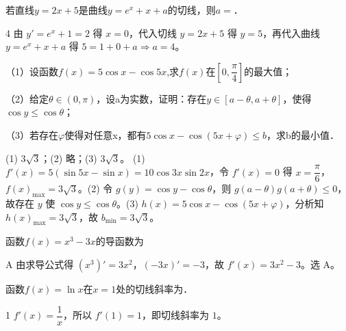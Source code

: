


\begin{question}
若直线$y=2x+5$是曲线$y=e^x+x+a$的切线，则$a=$\blank{3cm}．
\end{question}
\begin{answer}{4}
由 $y'=e^x+1=2$ 得 $x=0$，代入切线 $y=2x+5$ 得 $y=5$，再代入曲线 $y=e^x+x+a$ 得 $5=1+0+a\Rightarrow a=4$。
\end{answer}

\begin{question}
（1）设函数$f(x)=5\cos x-\cos 5x$,求$f(x)$在$\left[ 0,\dfrac{\pi}{4} \right]$的最大值；

（2）给定$\theta \in (0,\pi)$，设a为实数，证明：存在$y\in [a-\theta ,a+\theta ]$，使得$\cos y\le \cos \theta $；

（3）若存在$\varphi $使得对任意x，都有$5\cos x-\cos (5x+\varphi )\le b$，求b的最小值．
\end{question}
\begin{answer}{(1) $3\sqrt3$；(2) 略；(3) $3\sqrt3$。}
(1) $f'(x)=5(\sin5x-\sin x)=10\cos3x\sin2x$，令 $f'(x)=0$ 得 $x=\dfrac{\pi}{6}$，$f(x)_{\max}=3\sqrt3$。(2) 令 $g(y)=\cos y-\cos\theta$，则 $g(a-\theta)g(a+\theta)\le0$，故存在 $y$ 使 $\cos y\le\cos\theta$。(3) $h(x)=5\cos x-\cos(5x+\varphi)$，分析知 $h(x)_{\max}=3\sqrt3$，故 $b_{\min}=3\sqrt3$。
\end{answer}

\begin{question}[GPT生成]
函数$f(x)=x^3-3x$的导函数为\choiceBox
{}
\end{question}
\begin{answer}{A}
由求导公式得 $(x^3)'=3x^2$，$(-3x)'=-3$，故 $f'(x)=3x^2-3$。选 A。
\end{answer}


\begin{question}[GPT生成]
函数$f(x)=\ln x$在$x=1$处的切线斜率为\blank{3cm}．
\end{question}
\begin{answer}{1}
$f'(x)=\dfrac1x$，所以 $f'(1)=1$，即切线斜率为 $1$。
\end{answer}


